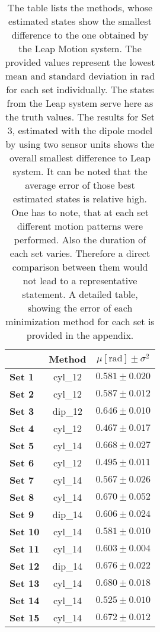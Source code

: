 \begin{table}[h]
\centering
\begin{tabular}{l c c}
\toprule
 & Method & $ \mu [\si{\radian}] \pm \sigma^{2} $ \\ \midrule 
\textbf{Set 1}  & cyl\_12 & $ 0.581 \pm 0.020 $ \\ 
\textbf{Set 2}  & cyl\_12 & $ 0.587 \pm 0.012 $ \\ 
\textbf{Set 3}  & dip\_12 & $ 0.646 \pm 0.010 $ \\ 
\textbf{Set 4}  & cyl\_12 & $ 0.467 \pm 0.017 $ \\ 
\textbf{Set 5}  & cyl\_14 & $ 0.668 \pm 0.027 $ \\ 
\textbf{Set 6}  & cyl\_12 & $ 0.495 \pm 0.011 $ \\ 
\textbf{Set 7}  & cyl\_14 & $ 0.567 \pm 0.026 $ \\ 
\textbf{Set 8}  & cyl\_14 & $ 0.670 \pm 0.052 $ \\ 
\textbf{Set 9}  & dip\_14 & $ 0.606 \pm 0.024 $ \\ 
\textbf{Set 10} & cyl\_14 & $ 0.581 \pm 0.010 $ \\ 
\textbf{Set 11} & cyl\_14 & $ 0.603 \pm 0.004 $ \\ 
\textbf{Set 12} & dip\_14 & $ 0.676 \pm 0.022 $ \\ 
\textbf{Set 13} & cyl\_14 & $ 0.680 \pm 0.018 $ \\ 
\textbf{Set 14} & cyl\_14 & $ 0.525 \pm 0.010 $ \\ 
\textbf{Set 15} & cyl\_14 & $ 0.672 \pm 0.012 $ \\ \bottomrule
\end{tabular}
\caption[Parameters for the estimation results, showing the smallest difference to the Leap Motion]
{The table lists the methods, whose estimated states show the smallest difference to the one obtained by the Leap Motion system. The provided values represent the lowest mean and standard deviation in \si{\radian} for each set individually. The states from the Leap system serve here as the truth values. The results for Set 3, estimated with the dipole model by using two sensor units shows the overall smallest difference to Leap system. It can be noted that the average error of those best estimated states is relative high. One has to note, that at each set different motion patterns were performed. Also the duration of each set varies. Therefore a direct comparison between them would not lead to a representative statement. A detailed table, showing the error of each minimization method for each set is provided in the appendix.}
\label{tab:estSet}
\end{table}
